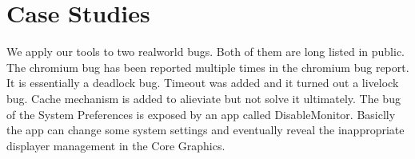 \section{Case Studies}
We apply our tools to two realworld bugs.
Both of them are long listed in public.
The chromium bug has been reported multiple times in the chromium bug report.
It is essentially a deadlock bug.
Timeout was added and it turned out a livelock bug.
Cache mechanism is added to alieviate but not solve it ultimately.
The bug of the System Preferences is exposed by an app called DisableMonitor.
Basiclly the app can change some system settings and eventually reveal the inappropriate displayer management
in the Core Graphics.


